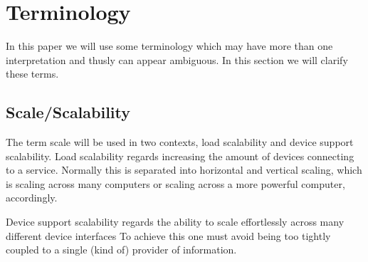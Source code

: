 \section{Terminology}

In this paper we will use some terminology which may have more than one interpretation and thusly can appear ambiguous.
In this section we will clarify these terms.

\subsection{Scale/Scalability}
The term scale will be used in two contexts, load scalability and device support scalability.
Load scalability regards increasing the amount of devices connecting to a service.
Normally this is separated into horizontal and vertical scaling, which is scaling across many computers or scaling across a more powerful computer, accordingly.

Device support scalability regards the ability to scale effortlessly across many different device interfaces
To achieve this one must avoid being too tightly coupled to a single (kind of) provider of information.

